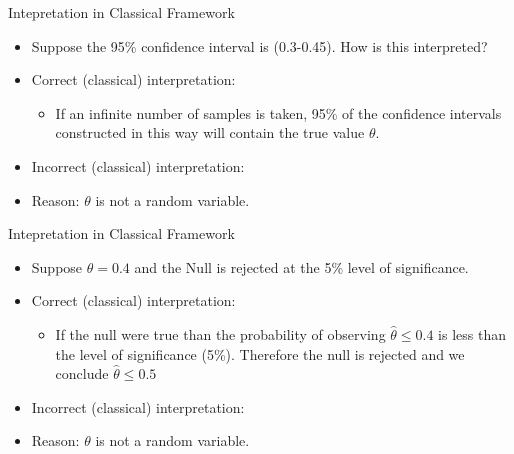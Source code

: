 \documentclass[10pt]{beamer}
\begin{document}
\begin{frame}{Intepretation in Classical Framework}
  \begin{itemize}
  \item Suppose the 95\% confidence interval is (0.3-0.45).  How is this interpreted?

  \item Correct (classical) interpretation:

    \begin{itemize}
    \item If an infinite number of samples is taken, 95\% of the confidence intervals constructed in this way will contain the true value $\theta$.
    \end{itemize}

  \item Incorrect (classical) interpretation:


  \item Reason: $\theta$ is not a random variable.
  \end{itemize}
\end{frame}
\begin{frame}{Intepretation in Classical Framework}
  \begin{itemize}
  \item Suppose $\hat{\theta}=0.4$ and the Null is rejected at the 5\% level of significance.

  \item Correct (classical) interpretation:

    \begin{itemize}
    \item If the null were true than the probability of observing $\hat{\theta}\leq 0.4$ is less than the level of significance (5\%).  Therefore the null is rejected and we conclude  $\hat{\theta}\leq 0.5$
    \end{itemize}

  \item Incorrect (classical) interpretation:


  \item Reason: $\theta$ is not a random variable.
  \end{itemize}
\end{frame}
\end{document}
